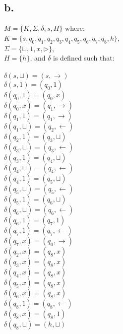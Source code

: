 \documentclass[12pt]{article}
\begin{document}
\subsection*{b.}

$M      = \{K, \Sigma, \delta, s, H\}$ where:\\
$K      = \{s, q_0, q_1, q_2, q_3, q_4, q_5, q_6, q_7, q_8, h\}$,\\
$\Sigma = \{\sqcup, 1, x, \triangleright                     \}$,\\
$H      = \{h                                                \}$, and $\delta$ is defined 
such that:\\ \\
$\delta(s, \sqcup) = (s, \rightarrow)$\\
$\delta(s, 1) = (q_0, 1)$\\
$\delta(q_0, 1) = (q_0, x)$\\
$\delta(q_0, x) = (q_1, \rightarrow)$\\
$\delta(q_1, 1) = (q_1, \rightarrow)$\\
$\delta(q_1, \sqcup) = (q_2, \leftarrow)$\\
$\delta(q_2, 1) = (q_3, \sqcup)$\\
$\delta(q_3, \sqcup) = (q_3, \leftarrow)$\\
$\delta(q_3, 1) = (q_4, \sqcup)$\\
$\delta(q_4, \sqcup) = (q_4, \leftarrow)$\\
$\delta(q_4, 1) = (q_5, \sqcup)$\\
$\delta(q_5, \sqcup) = (q_5, \leftarrow)$\\
$\delta(q_5, 1) = (q_6, \sqcup)$\\
$\delta(q_6, \sqcup) = (q_6, \leftarrow)$\\
$\delta(q_6, 1) = (q_7, 1)$\\
$\delta(q_7, 1) = (q_7, \leftarrow)$\\
$\delta(q_7, x) = (q_0, \rightarrow)$\\
$\delta(q_2, x) = (q_8, x)$\\
$\delta(q_3, x) = (q_8, x)$\\
$\delta(q_4, x) = (q_8, x)$\\
$\delta(q_5, x) = (q_8, x)$\\
$\delta(q_6, x) = (q_8, x)$\\
$\delta(q_8, 1) = (q_8, \leftarrow)$\\
$\delta(q_8, x) = (q_8, 1)$\\
$\delta(q_8, \sqcup) = (h, \sqcup)$\\
\end{document}
